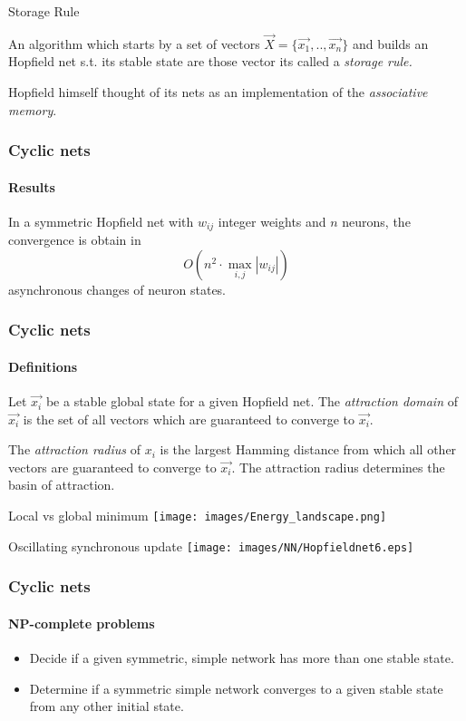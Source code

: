 \documentclass{beamer}
\begin{document}
\begin{frame}{Storage Rule}
\justify
	\begin{definition}
		\justify
		An algorithm which starts by a set of  vectors $\vec{X}=\{\vec{x_1},..,\vec{x_n}\}$ and builds an Hopfield net s.t. its stable state are those vector its called a \textit{storage rule.}
	\end{definition}
	Hopfield himself thought of its nets as an implementation of the \textit{associative memory}.
\end{frame}

\begin{frame}
\frametitle{Cyclic nets}
\framesubtitle{Results}
\begin{theorem}
	\justify
	In a symmetric Hopfield net with $w_{ij}$ integer weights and $n$ neurons, the convergence is obtain in 
	\[
	O(n^2 \cdot \max_{i,j} |w_{ij}|)
	\]
	asynchronous changes of neuron states.
\end{theorem}
\end{frame}

\begin{frame}
	\frametitle{Cyclic nets}
	\framesubtitle{Definitions}
	\begin{definition}
		\justify
		Let $\vec{x_i}$ be a stable global state for a given Hopfield net. The \textit{attraction domain} of $\vec{x_i}$ is the set of all vectors which are guaranteed to converge to $\vec{x_i}.$
	\end{definition}
	\begin{definition}
		\justify
		The \textit{attraction radius} of $x_i$ is the largest Hamming distance from which all other vectors are guaranteed to converge to $\vec{x_i}.$ The attraction radius determines the basin of attraction.
	\end{definition}
\end{frame}

\begin{frame}{Local vs global minimum}
\texttt{[image: images/Energy\_landscape.png]}
	
\end{frame}

\begin{frame}{Oscillating synchronous update}
\texttt{[image: images/NN/Hopfieldnet6.eps]}
\end{frame}

\begin{frame}
\frametitle{Cyclic nets}
\framesubtitle{NP-complete problems}
\justify
	\begin{itemize}
		\item Decide if a given symmetric, simple network has more than one stable state.
		\item Determine if a symmetric simple network converges to a given stable state from any other initial state.
	\end{itemize}
\end{frame}
\end{document}

